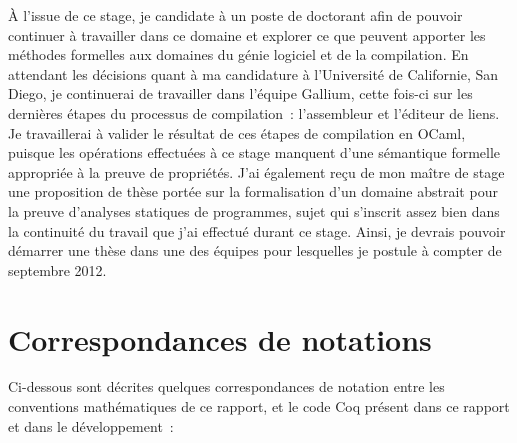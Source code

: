 \documentclass{article}
\begin{document}
À l'issue de ce stage, je candidate à un poste de doctorant afin de pouvoir
continuer à travailler dans ce domaine et explorer ce que peuvent apporter les
méthodes formelles aux domaines du génie logiciel et de la compilation. En
attendant les décisions quant à ma candidature à l'Université de Californie,
San Diego, je continuerai de travailler dans l'équipe Gallium, cette fois-ci
sur les dernières étapes du processus de compilation~: l'assembleur et
l'éditeur de liens. Je travaillerai à valider le résultat de ces étapes de
compilation en OCaml, puisque les opérations effectuées à ce stage manquent
d'une sémantique formelle appropriée à la preuve de propriétés. J'ai également
reçu de mon maître de stage une proposition de thèse portée sur la
formalisation d'un domaine abstrait pour la preuve d'analyses statiques de
programmes, sujet qui s'inscrit assez bien dans la continuité du travail que
j'ai effectué durant ce stage. Ainsi, je devrais pouvoir démarrer une thèse
dans une des équipes pour lesquelles je postule à compter de septembre 2012.

\newpage

\appendix

\section{Correspondances de notations}

Ci-dessous sont décrites quelques correspondances de notation entre les
conventions mathématiques de ce rapport, et le code Coq présent dans ce rapport
et dans le développement~:
\end{document}
